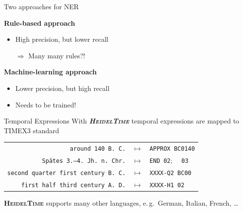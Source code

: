 \documentclass[xcolor=x11names, aspectratio=169,usenames,dvipsnames]{beamer}
\begin{document}
\begin{frame}{Two approaches for NER}
\begin{minipage}[t]{0.45\textwidth}
\textbf{Rule-based approach}
\begin{itemize}
\item High precision, but lower recall

$\Rightarrow$ \alert{Many many rules?!}
\end{itemize}
\end{minipage}\pause\pause\hfill
\begin{minipage}[t]{0.45\textwidth}
\textbf{Machine-learning approach}
\begin{itemize}
\item Lower precision, but high recall
\item \alert{Needs to be trained!}
\end{itemize}%
\end{minipage}
\end{frame}

\begin{frame}{Temporal Expressions}
With \textbf{\textit{\textsc{HeidelTime}}} temporal expressions are mapped to TIMEX3 standard
\begin{center}
{\renewcommand{\arraystretch}{1.2}%
\begin{tabular}{rcl}
\texttt{around 140 B.\,C.}&$\longmapsto$&\texttt{APPROX BC0140}\\
\texttt{Spätes 3.–4.\ Jh.\ n.\,Chr.}&$\longmapsto$&\texttt{END 02};~~ \texttt{03}\\
\texttt{second quarter first century B.\,C.}&$\longmapsto$&\texttt{XXXX-Q2 BC00}\\
\texttt{first half third century A.\,D.}&$\longmapsto$&\texttt{XXXX-H1 02}\\
\end{tabular}
}
\end{center}

\textbf{\textsc{HeidelTime}} supports many other languages, e.\,g.\ German, Italian, French, \dots
\end{frame}
\end{document}
